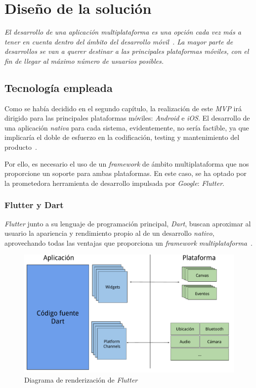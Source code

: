 \chapter{Diseño de la solución}
\textit{El desarrollo de una aplicación multiplataforma es una opción cada vez más a tener en 
cuenta dentro del ámbito del desarrollo móvil~\cite{10.1145/3241739}. La mayor parte de desarrollos
se van a querer destinar a las principales plataformas móviles, 
con el fin de llegar al máximo número de usuarios posibles.
}

\section{Tecnología empleada}
Como se había decidido en el segundo capítulo, la realización de este \textit{MVP} irá dirigido para las
principales plataformas móviles: \textit{Android} e \textit{iOS}. El desarrollo de una aplicación \textit{nativa} para 
cada sistema, evidentemente, no sería factible, ya que implicaría el doble de esfuerzo en la codificación,
testing y mantenimiento del producto~\cite{10.1145/2480362.2480464}.

Por ello, es necesario el uso de un \textit{framework} de ámbito multiplataforma que nos proporcione un
soporte para ambas plataformas. En este caso, se ha optado por la prometedora herramienta de desarrollo
impulsada por \textit{Google}: \textit{Flutter}.

\subsection{Flutter y Dart}
\textit{Flutter} junto a su lenguaje de programación principal, \textit{Dart}, buscan 
aproximar al usuario la apariencia y rendimiento 
propio al de un desarrollo \textit{nativo}, aprovechando todas las ventajas que proporciona 
un \textit{framework multiplataforma}~\cite{7934674}.

\begin{figure}[H]
    \centering
    \includegraphics[scale=0.45]{images/flutter1.pdf}
    \caption{Diagrama de renderización de \textit{Flutter}\cite{leler2019s}}
    \label{fig:flutter1}
  \end{figure}

